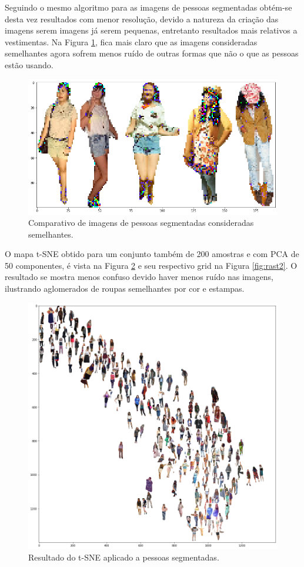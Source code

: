 \documentclass[12pt]{report}
\begin{document}
Seguindo o mesmo algoritmo para as imagens de pessoas segmentadas obtém-se desta vez resultados com menor resolução, devido a natureza da criação das imagens serem imagens já serem pequenas, entretanto resultados mais relativos a vestimentas. Na Figura \ref{fig:compasegs}, fica mais claro que as imagens consideradas semelhantes agora sofrem menos ruído de outras formas que não o que as pessoas estão usando. 

\begin{figure}
    \centering
    \includegraphics[scale=0.4]{images/resultados/compasegs.png}
    \caption{Comparativo de imagens de pessoas segmentadas consideradas semelhantes.}
    \label{fig:compasegs}
\end{figure}

O mapa t-SNE obtido para um conjunto também de 200 amostras e com PCA de 50 componentes, é vista na Figura \ref{fig:tsne3} e seu respectivo grid na Figura \ref{fig:rast2}. O resultado se mostra menos confuso devido haver menos ruído nas imagens, ilustrando aglomerados de roupas semelhantes por cor e estampas. 

\begin{figure}
    \centering
    \includegraphics[scale=0.5]{images/resultados/tsne3.png}
    \caption{Resultado do t-SNE aplicado a pessoas segmentadas.}
    \label{fig:tsne3}
\end{figure}
\end{document}

